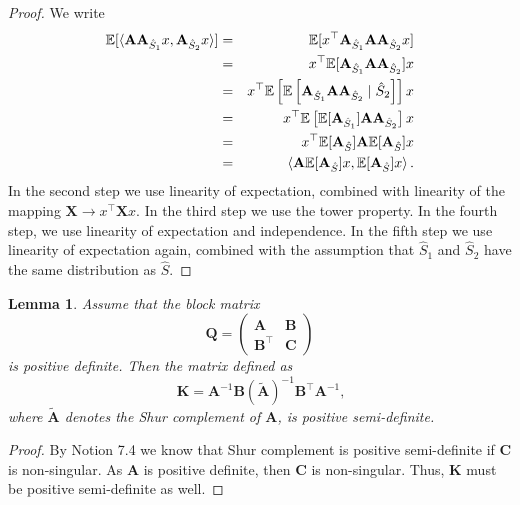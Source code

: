 \documentclass[11pt]{article}
\newtheorem{lemma}{Lemma}
\newcommand{\bA}{\mathbf{A}}
\newcommand{\bX}{\mathbf{X}}
\newcommand{\bQ}{\mathbf{Q}}
\begin{document}
	\begin{proof}
	We write
		\begin{eqnarray*}
			\mathbb{E}[\braket{\bA \bA_{\hat{S}_1}x,\bA_{\hat{S}_2}x}] 
		&=& \mathbb{E}[x^\top \bA_{\hat{S}_1}\bA \bA_{\hat{S}_2}x] \\
		&=& x^\top\mathbb{E}[\bA_{\hat{S}_1}\bA \bA_{\hat{S}_2}]x \\
			&
			= &  x^\top \mathbb{E}\left[\mathbb{E}\left[\bA_{\hat{S}_1}\bA\bA_{\hat{S}_2} \;|\; \hat{S}_2 \right]\right]x \\
			&=& x^\top \mathbb{E}\left[ \mathbb{E}[\bA_{\hat{S}_1}] \bA\bA_{\hat{S}_2}  \right]x  \\
			&= &x^\top \mathbb{E}[\bA_{\hat{S}}]\bA\mathbb{E}[\bA_{\hat{S}}]x \\
			&=& \braket{\bA\mathbb{E}[\bA_{\hat{S}}]x,\mathbb{E}[\bA_{\hat{S}}]x}.
		\end{eqnarray*}
In the second step we use linearity of expectation, combined with linearity of the mapping $\bX \to x^\top \bX x$. In the third step we use the tower property. 		In the fourth step, we use linearity of expectation and independence. In the fifth step we use linearity of expectation again, combined with the assumption that $\hat{S}_1$ and $\hat{S}_2$ have the same distribution as $\hat{S}$.
	\end{proof}
	
	\begin{lemma}\label{lemma:shur_pos}
		Assume that the block matrix
		\begin{equation}
			\bQ=\begin{pmatrix}
				\mathbf{A} & \mathbf{B} \\
				\mathbf{B}^\top & \mathbf{C} 
			\end{pmatrix}
		\end{equation} is positive definite. Then the matrix defined as 
		\begin{equation}\
			\mathbf{K}=\mathbf{A}^{-1}\mathbf{B}(\tilde{\mathbf{A}})^{-1}\mathbf{B}^\top\mathbf{A}^{-1},
		\end{equation}  where $\tilde{\mathbf{A}}$ denotes the Shur complement of  $\mathbf{A}$,
		is positive semi-definite.
	\end{lemma}
	\begin{proof}
		By \cite{Zhang2011} Notion 7.4 we know that Shur complement is positive semi-definite if $\mathbf{C}$ is non-singular. As $\mathbf{A}$ is positive definite, then $\mathbf{C}$ is non-singular. Thus, $\mathbf{K}$ must be positive semi-definite as well.
	\end{proof}
	
\end{document}

